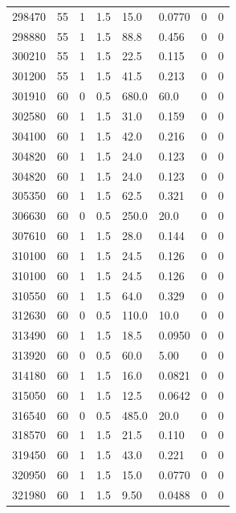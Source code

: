 \documentclass[preview]{standalone}
\begin{document}
{{{{{{{{{\begin{tabular}{L{1.2cm}C{1.2cm} C{0.3cm}C{0.5cm} C{1.4cm}C{1.4cm} C{1.4cm}C{1.4cm}}
  298470  &    55  & 1     & 1.5 &  15.0  & 0.0770  & 0 &  0   \\ 
  298880  &    55  & 1     & 1.5 &  88.8  & 0.456  & 0 &  0   \\ 
  300210  &    55  & 1     & 1.5 &  22.5  & 0.115  & 0 &  0   \\ 
  301200  &    55  & 1     & 1.5 &  41.5  & 0.213  & 0 &  0   \\ 
  301910  &    60  & 0     & 0.5 &  680.0  & 60.0  & 0 &  0   \\ 
  302580  &    60  & 1     & 1.5 &  31.0  & 0.159  & 0 &  0   \\ 
  304100  &    60  & 1     & 1.5 &  42.0  & 0.216  & 0 &  0   \\ 
  304820  &    60  & 1     & 1.5 &  24.0  & 0.123  & 0 &  0   \\ 
  304820  &    60  & 1     & 1.5 &  24.0  & 0.123  & 0 &  0   \\ 
  305350  &    60  & 1     & 1.5 &  62.5  & 0.321  & 0 &  0   \\ 
  306630  &    60  & 0     & 0.5 &  250.0  & 20.0  & 0 &  0   \\ 
  307610  &    60  & 1     & 1.5 &  28.0  & 0.144  & 0 &  0   \\ 
  310100  &    60  & 1     & 1.5 &  24.5  & 0.126  & 0 &  0   \\ 
  310100  &    60  & 1     & 1.5 &  24.5  & 0.126  & 0 &  0   \\ 
  310550  &    60  & 1     & 1.5 &  64.0  & 0.329  & 0 &  0   \\ 
  312630  &    60  & 0     & 0.5 &  110.0  & 10.0  & 0 &  0   \\ 
  313490  &    60  & 1     & 1.5 &  18.5  & 0.0950  & 0 &  0   \\ 
  313920  &    60  & 0     & 0.5 &  60.0  & 5.00  & 0 &  0   \\ 
  314180  &    60  & 1     & 1.5 &  16.0  & 0.0821  & 0 &  0   \\ 
  315050  &    60  & 1     & 1.5 &  12.5  & 0.0642  & 0 &  0   \\ 
  316540  &    60  & 0     & 0.5 &  485.0  & 20.0  & 0 &  0   \\ 
  318570  &    60  & 1     & 1.5 &  21.5  & 0.110  & 0 &  0   \\ 
  319450  &    60  & 1     & 1.5 &  43.0  & 0.221  & 0 &  0   \\ 
  320950  &    60  & 1     & 1.5 &  15.0  & 0.0770  & 0 &  0   \\ 
  321980  &    60  & 1     & 1.5 &  9.50  & 0.0488  & 0 &  0   \\ 
\hline 
\end{tabular} 

}}}}}}}}}
\end{document}
